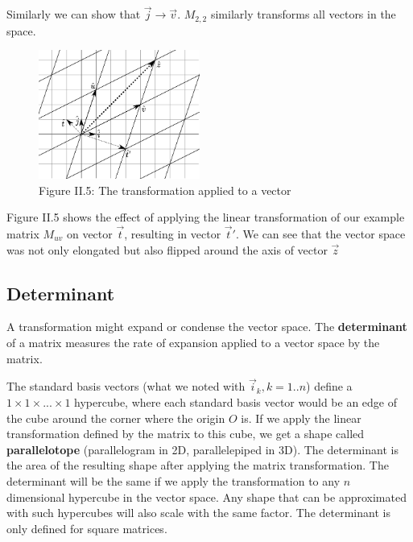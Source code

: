 Similarly we can show that \(\vec j \rightarrow \vec v\). \(M_{2,2}\) similarly transforms all vectors in the space.


\begin{figure}[htbp]
    \begin{center}
        \includegraphics[width=150pt]{../img/ii-matrix-2.png}
        \caption{Figure II.5: The transformation applied to a vector}
    \end{center}
\end{figure}


Figure II.5 shows the effect of applying the linear transformation of our example matrix \(M_{uv}\) on vector \(\vec t\), resulting in vector \(\vec t'\). We can see that the vector space was not only elongated but also flipped around the axis of vector \(\vec z\)

\subsection{Determinant}

A transformation might expand or condense the vector space. The \textbf{determinant} of a matrix measures the rate of expansion applied to a vector space by the matrix.

The standard basis vectors (what we noted with \(\vec i_k, k = 1..n\)) define a \(1 \times 1 \times ... \times 1\) hypercube, where each standard basis vector would be an edge of the cube around the corner where the origin \(O\) is. If we apply the linear transformation defined by the matrix to this cube, we get a shape called \textbf{parallelotope} (parallelogram in 2D, parallelepiped in 3D). The determinant is the area of the resulting shape after applying the matrix transformation. The determinant will be the same if we apply the transformation to any \(n\) dimensional hypercube in the vector space. Any shape that can be approximated with such hypercubes will also scale with the same factor. The determinant is only defined for square matrices.

